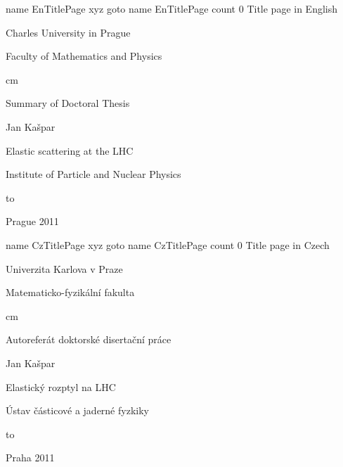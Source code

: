 \def\InsertToc{%
	\vskip3cm%
	\def\currentChapterName{Contents} \def\currentPartName{}%
	\pdfdest name {TOC} xyz
	\pdfoutline goto name {TOC} count 0 {\currentChapterName}%
	\hbox{%
		\vtop{%
			\noindent
			\fchapter Contents
		}%
	}%
	\vskip1\baselineskip
	\jobname.toc
}


\pdfdest name {EnTitlePage} xyz
\pdfoutline goto name {EnTitlePage} count 0 {Title page in English}%


\centerline{\fPbxiv Charles University in Prague}
\centerline{\fPbxiv Faculty of Mathematics and Physics}
	cm
\centerline{\fPbxx Summary of Doctoral Thesis}
\vskip1cm
\centerline{}
\vskip3cm
\centerline{\fPbxiv Jan Ka\v spar}
\vskip1cm
\centerline{\fPbxx Elastic scattering at the LHC}
\centerline{\fPbxx\FootText}
\vskip2cm
\centerline{\fPbxiv Institute of Particle and Nuclear Physics}
\ialign to
\vskip2cm
\centerline{\fPbxiv Prague 2011}

\vfil\eject


\bgroup


\pdfdest name {CzTitlePage} xyz
\pdfoutline goto name {CzTitlePage} count 0 {Title page in Czech}%

\centerline{\fPbxiv Univerzita Karlova v Praze}
\centerline{\fPbxiv Matematicko-fyzikální fakulta}
	cm
\centerline{\fPbxx Autoreferát doktorské disertační práce}
\vskip1cm
\centerline{}
\vskip3cm
\centerline{\fPbxiv Jan Kašpar}
\vskip1cm
\centerline{\fPbxx Elastický rozptyl na LHC}
\centerline{\fPbxx\FootText}
\vskip2cm
\centerline{\fPbxiv Ústav částicové a jaderné fyzkiky}
\ialign to
\vskip2cm
\centerline{\fPbxiv Praha 2011}

